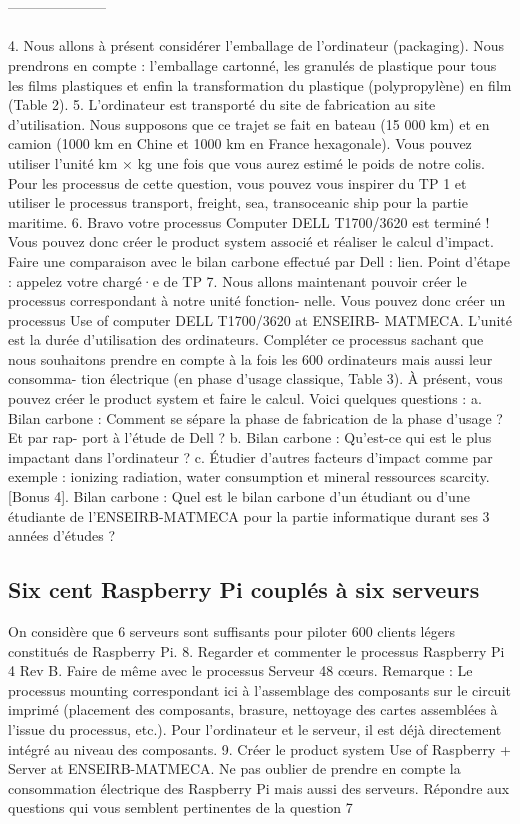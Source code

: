 \documentclass[12pt,a4paper]{paper}
\begin{document}
\\ \\ --------------------- \\ \\
4. Nous allons à présent considérer l’emballage de l’ordinateur (packaging). Nous prendrons en
compte : l’emballage cartonné, les granulés de plastique pour tous les films plastiques et enfin la
transformation du plastique (polypropylène) en film (Table 2).
5. L’ordinateur est transporté du site de fabrication au site d’utilisation. Nous supposons que
ce trajet se fait en bateau (15 000 km) et en camion (1000 km en Chine et 1000 km en France
hexagonale). Vous pouvez utiliser l’unité km × kg une fois que vous aurez estimé le poids de
notre colis. Pour les processus de cette question, vous pouvez vous inspirer du TP 1 et utiliser
le processus transport, freight, sea, transoceanic ship pour la partie maritime.
6. Bravo votre processus Computer DELL T1700/3620 est terminé ! Vous pouvez donc créer le
product system associé et réaliser le calcul d’impact. Faire une comparaison avec le bilan carbone
effectué par Dell : lien.
Point d’étape : appelez votre chargé·e de TP
7. Nous allons maintenant pouvoir créer le processus correspondant à notre unité fonction-
nelle. Vous pouvez donc créer un processus Use of computer DELL T1700/3620 at ENSEIRB-
MATMECA. L’unité est la durée d’utilisation des ordinateurs. Compléter ce processus sachant
que nous souhaitons prendre en compte à la fois les 600 ordinateurs mais aussi leur consomma-
tion électrique (en phase d’usage classique, Table 3). À présent, vous pouvez créer le product
system et faire le calcul. Voici quelques questions :
a. Bilan carbone : Comment se sépare la phase de fabrication de la phase d’usage ? Et par rap-
port à l’étude de Dell ?
b. Bilan carbone : Qu’est-ce qui est le plus impactant dans l’ordinateur ?
c. Étudier d’autres facteurs d’impact comme par exemple : ionizing radiation, water consumption
et mineral ressources scarcity.
[Bonus 4]. Bilan carbone : Quel est le bilan carbone d’un étudiant ou d’une étudiante de
l’ENSEIRB-MATMECA pour la partie informatique durant ses 3 années d’études ?
\subsection{Six cent Raspberry Pi couplés à six serveurs}
On considère que 6 serveurs sont suffisants pour piloter 600 clients légers constitués de Raspberry
Pi.
8. Regarder et commenter le processus Raspberry Pi 4 Rev B. Faire de même avec le processus
Serveur 48 cœurs. Remarque : Le processus mounting correspondant ici à l’assemblage des
composants sur le circuit imprimé (placement des composants, brasure, nettoyage des cartes
assemblées à l’issue du processus, etc.). Pour l’ordinateur et le serveur, il est déjà directement
intégré au niveau des composants.
9. Créer le product system Use of Raspberry + Server at ENSEIRB-MATMECA. Ne pas oublier
de prendre en compte la consommation électrique des Raspberry Pi mais aussi des serveurs.
Répondre aux questions qui vous semblent pertinentes de la question 7\cite{Dell2018}
\end{document}
